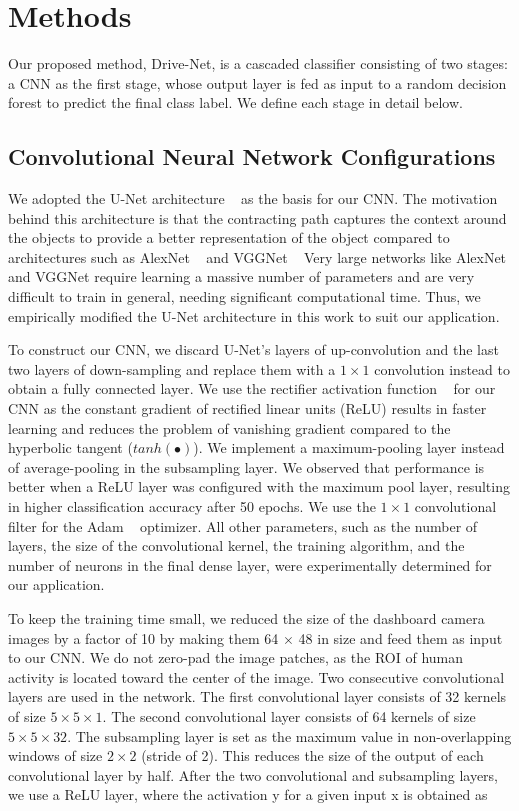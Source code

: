 \section{Methods}
Our proposed method, Drive-Net, is a cascaded classifier consisting of two stages: a CNN as the first stage, whose output layer is fed as input to a random decision forest to predict the final class label. We define each stage in detail below.



\subsection{Convolutional Neural Network Configurations} We adopted the U-Net architecture \unskip~\cite{1641075:26775850} as the basis for our CNN. The motivation behind this architecture is that the contracting path captures the context around the objects to provide a better representation of the object compared to architectures such as AlexNet \unskip~\cite{1641075:26775852} and VGGNet \unskip~\cite{1641075:26775860} Very large networks like AlexNet and VGGNet require learning a massive number of parameters and are very difficult to train in general, needing significant computational time. Thus, we empirically modified the U-Net architecture in this work to suit our application.

To construct our CNN, we discard U-Net's layers of up-convolution and the last two layers of down-sampling and replace them with a $1\times1 $ convolution instead to obtain a fully connected layer. We use the rectifier activation function \unskip~\cite{1641075:26775860} for our CNN as the constant gradient of rectified linear units (ReLU) results in faster learning and reduces the problem of vanishing gradient compared to the hyperbolic tangent (${{tanh}{\left(\bullet\right)}} $). We implement a maximum-pooling layer instead of average-pooling in the subsampling layer. We observed that performance is better when a ReLU layer was configured with the maximum pool layer, resulting in higher classification accuracy after 50 epochs. We use the $1\times1 $ convolutional filter for the Adam \unskip~\cite{1641075:26775857} optimizer. All other parameters, such as the number of layers, the size of the convolutional kernel, the training algorithm, and the number of neurons in the final dense layer, were experimentally determined for our application.

To keep the training time small, we reduced the size of the dashboard camera images by a factor of 10 by making them 64 $\times$ 48 in size and feed them as input to our CNN. We do not zero-pad the image patches, as the ROI of human activity is located toward the center of the image. Two consecutive convolutional layers are used in the network. The first convolutional layer consists of 32 kernels of size $5\times5\times1 $. The second convolutional layer consists of 64 kernels of size $5\times5\times32 $. The subsampling layer is set as the maximum value in non-overlapping windows of size $2\times2 $ (stride of 2). This reduces the size of the output of each convolutional layer by half. After the two convolutional and subsampling layers, we use a ReLU layer, where the activation y for a given input x is obtained as

